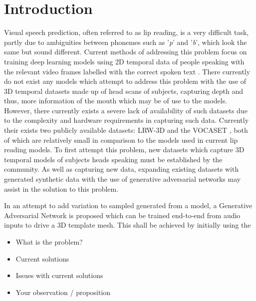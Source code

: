 %
%
%
%
%

\chapter{Introduction}

Visual speech prediction, often referred to as lip reading, is a very difficult task, partly due to ambiguities between phonemes such as '\textit{p}' and '\textit{b}', which look the same but sound different.
Current methods of addressing this problem focus on training deep learning models using 2D temporal data of people speaking with the relevant video frames labelled with the correct spoken text \cite{Chung2016, Assael2016, Chung2017, Shillingford2018}.
There currently do not exist any models which attempt to address this problem with the use of 3D temporal datasets made up of head scans of subjects, capturing depth and thus, more information of the mouth which may be of use to the models.
However, there currently exists a severe lack of availability of such datasets due to the complexity and hardware requirements in capturing such data.
Currently their exists two publicly available datasets: LRW-3D \cite{Tzirakis2019} and the VOCASET \cite{Cudeiro2019}, both of which are relatively small in comparison to the models used in current lip reading models.
To first attempt this problem, new datasets which capture 3D temporal models of subjects heads speaking must be established by the community.
As well as capturing new data, expanding existing datasets with generated synthetic data with the use of generative adversarial networks may assist in the solution to this problem.


In an attempt to add variation to sampled generated from a model, a Generative Adversarial Network is proposed which can be trained end-to-end from audio inputs to drive a 3D template mesh.
This shall be achieved by initially using the 

\begin{itemize}

    \item What is the problem?
    \item Current solutions
    \item Issues with current solutions
    \item Your observation / proposition

\end{itemize}

%
%
%